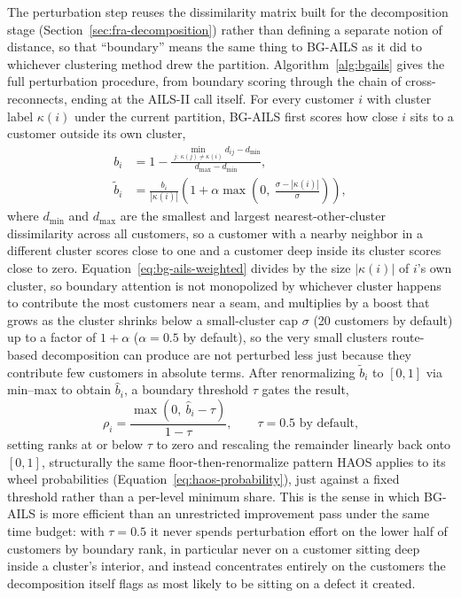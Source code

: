 The perturbation step reuses the dissimilarity matrix built for the decomposition stage (Section~\ref{sec:fra-decomposition}) rather than defining a separate notion of distance, so that ``boundary'' means the same thing to BG-AILS as it did to whichever clustering method drew the partition. Algorithm~\ref{alg:bgails} gives the full perturbation procedure, from boundary scoring through the chain of cross-reconnects, ending at the AILS-II call itself. For every customer $i$ with cluster label $\kappa(i)$ under the current partition, BG-AILS first scores how close $i$ sits to a customer outside its own cluster,
\begin{align}
b_i &= 1 - \frac{\min_{j:\ \kappa(j) \neq \kappa(i)} d_{ij} - d_{\min}}{d_{\max} - d_{\min}}, \label{eq:bg-ails-boundary}\\
\tilde b_i &= \frac{b_i}{|\kappa(i)|}\left(1 + \alpha \max\!\left(0,\ \frac{\sigma - |\kappa(i)|}{\sigma}\right)\right), \label{eq:bg-ails-weighted}
\end{align}
where $d_{\min}$ and $d_{\max}$ are the smallest and largest nearest-other-cluster dissimilarity across all customers, so a customer with a nearby neighbor in a different cluster scores close to one and a customer deep inside its cluster scores close to zero. Equation~\ref{eq:bg-ails-weighted} divides by the size $|\kappa(i)|$ of $i$'s own cluster, so boundary attention is not monopolized by whichever cluster happens to contribute the most customers near a seam, and multiplies by a boost that grows as the cluster shrinks below a small-cluster cap $\sigma$ (20 customers by default) up to a factor of $1 + \alpha$ ($\alpha = 0.5$ by default), so the very small clusters route-based decomposition can produce are not perturbed less just because they contribute few customers in absolute terms. After renormalizing $\tilde b_i$ to $[0, 1]$ via min--max to obtain $\hat b_i$, a boundary threshold $\tau$ gates the result,
\begin{equation}
\rho_i = \frac{\max(0,\ \hat b_i - \tau)}{1 - \tau}, \qquad \tau = 0.5 \text{ by default,}
\label{eq:bg-ails-threshold}
\end{equation}
setting ranks at or below $\tau$ to zero and rescaling the remainder linearly back onto $[0, 1]$, structurally the same floor-then-renormalize pattern HAOS applies to its wheel probabilities (Equation~\ref{eq:haos-probability}), just against a fixed threshold rather than a per-level minimum share. This is the sense in which BG-AILS is more efficient than an unrestricted improvement pass under the same time budget: with $\tau = 0.5$ it never spends perturbation effort on the lower half of customers by boundary rank, in particular never on a customer sitting deep inside a cluster's interior, and instead concentrates entirely on the customers the decomposition itself flags as most likely to be sitting on a defect it created.


